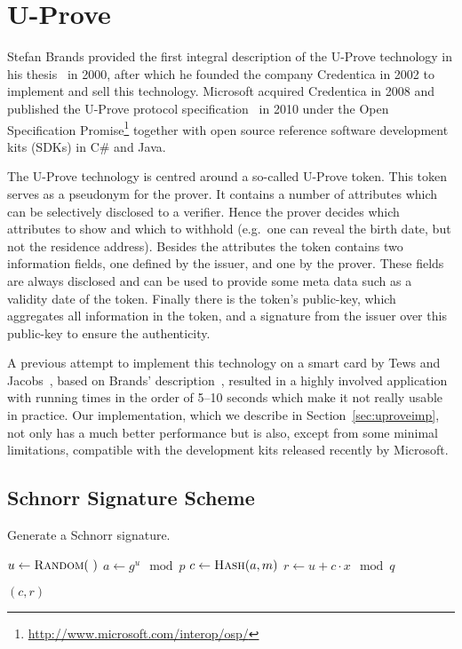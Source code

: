 \chapter{U-Prove}

Stefan Brands provided the first integral description of the U-Prove
technology in his thesis~\cite{Brands2000} in 2000, after which he founded
the company Credentica in 2002 to implement and sell this technology.
Microsoft acquired Credentica in 2008 and published the U-Prove protocol
specification~\cite{U-Prove_Crypto2013} in 2010 under the Open
Specification
Promise\footnote{\url{http://www.microsoft.com/interop/osp/}} together with
open source reference software development kits (SDKs) in C\# and Java.

The U-Prove technology is centred around a so-called U-Prove token. This
token serves as a pseudonym for the prover. It contains a number of
attributes which can be selectively disclosed to a verifier. Hence the
prover decides which attributes to show and which to withhold (e.g.\ one
can reveal the birth date, but not the residence address). Besides the
attributes the token contains two information fields, one defined by the
issuer, and one by the prover. These fields are always disclosed and can be
used to provide some meta data such as a validity date of the token.
Finally there is the token's public-key, which aggregates all information
in the token, and a signature from the issuer over this public-key to
ensure the authenticity.

A previous attempt to implement this technology on a smart card by Tews and
Jacobs~\cite{TewsJacobs09}, based on Brands' description~\cite{Brands2000},
resulted in a highly involved application with running times in the order
of 5--10 seconds which make it not really usable in practice. Our
implementation, which we describe in Section~\ref{sec:uproveimp}, not only
has a much better performance but is also, except from some minimal
limitations, compatible with the development kits released recently by
Microsoft.

\section{Schnorr Signature Scheme}

\cite{Schnorr1989}

\begin{algorithm}
  \caption{Generate a Schnorr signature.}
  \label{alg:Schnorr-sign}
  \addtolength{\baselineskip}{1mm}
  \begin{algorithmic}[1]
      \State $u \gets \Call{Random}{~}$
      \State $a \gets g^u \mod p$
      \State $c \gets \Call{Hash}{a, m}$
      \State $r \gets u + c \cdot x \mod q$

      \Return $(c, r)$
    \EndFunction
  \end{algorithmic}
\end{algorithm}

